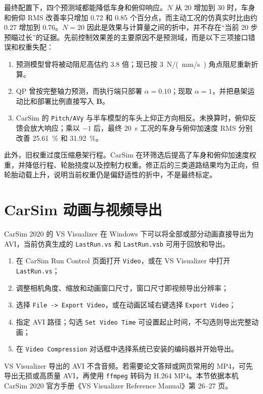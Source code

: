 \documentclass[UTF8,12pt,a4paper,fontset=windows]{ctexart}
\newcommand{\vect}[1]{\bm{#1}}
\begin{document}
最终配置下，四个预测域都能降低车身和俯仰响应。$N$ 从 20 增加到 30 时，车身和俯仰 RMS 改善率只增加 0.72 和 0.85 个百分点，而主动工况的仿真实时比由约 0.27 增加到 0.76。$N=20$ 因此是效果与计算量之间的折中，并不存在“当前 20 步预瞄过长”的证据。先前控制效果差的主要原因不是预测域，而是以下三项接口错误和权重失配：
\begin{enumerate}
  \item 预测模型曾将被动阻尼高估约 3.8 倍；现已按 \SI{3}{N/(mm/s)} 角点阻尼重新折算。
  \item QP 曾按完整轴力预测，而执行端只部署 $\alpha=0.10$；现取 $\alpha=1$，并把悬架运动比和部署比例直接写入 $\vect{B}$。
  \item CarSim 的 \texttt{Pitch/AVy} 与半车模型的车头上仰正方向相反。未换算时，俯仰反馈会放大响应；乘以 $-1$ 后，最终 \SI{20}{s} 工况的车身与俯仰加速度 RMS 分别改善 \SI{25.61}{\percent} 和 \SI{31.92}{\percent}。
\end{enumerate}

此外，旧权重过度压缩悬架行程。CarSim 在环筛选后提高了车身和俯仰加速度权重，并降低行程、轮胎挠度以及控制力权重。修正后的三类道路结果均为正向，但轮胎动载上升，说明当前权重仍是偏舒适性的折中，不是最终标定。

\section{CarSim 动画与视频导出}

CarSim 2020 的 VS Visualizer 在 Windows 下可以将全部或部分动画直接导出为 AVI，当前仿真生成的 \texttt{LastRun.vs} 和 \texttt{LastRun.vsb} 可用于回放和导出。

\begin{enumerate}
  \item 在 CarSim Run Control 页面打开 \texttt{Video}，或在 VS Visualizer 中打开 \texttt{LastRun.vs}；
  \item 调整相机角度、缩放和动画窗口尺寸，窗口尺寸即视频导出分辨率；
  \item 选择 \texttt{File -> Export Video}，或在动画区域右键选择 \texttt{Export Video}；
  \item 指定 AVI 路径；勾选 \texttt{Set Video Time} 可设置起止时间，不勾选则导出完整动画；
  \item 在 \texttt{Video Compression} 对话框中选择系统已安装的编码器并开始导出。
\end{enumerate}

VS Visualizer 导出的 AVI 不含音频。若需要论文答辩或网页常用的 MP4，可先导出无损或高质量 AVI，再使用 \texttt{ffmpeg} 转码为 H.264 MP4。本节依据本机 CarSim 2020 官方手册《VS Visualizer Reference Manual》第 26--27 页。
\end{document}
